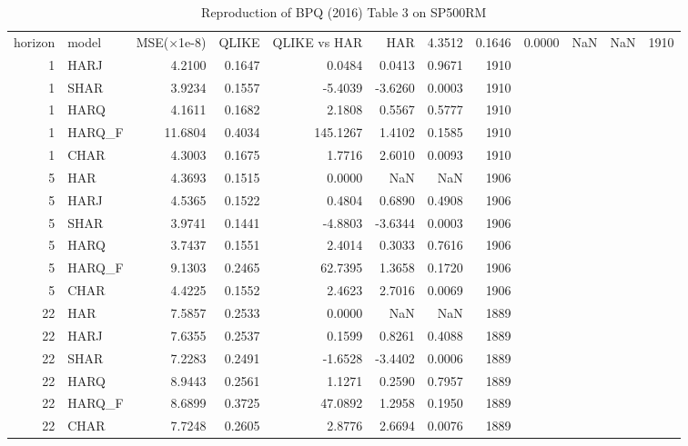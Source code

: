 \begin{table}
\caption{Reproduction of BPQ (2016) Table 3 on SP500RM}
\label{tab:table1_reproduction}
\begin{tabular}{rlrrrrrr}
\toprule
horizon & model & MSE(×1e-8) & QLIKE & QLIKE vs HAR %
 & HAR & 4.3512 & 0.1646 & 0.0000 & NaN & NaN & 1910 \\
1 & HARJ & 4.2100 & 0.1647 & 0.0484 & 0.0413 & 0.9671 & 1910 \\
1 & SHAR & 3.9234 & 0.1557 & -5.4039 & -3.6260 & 0.0003 & 1910 \\
1 & HARQ & 4.1611 & 0.1682 & 2.1808 & 0.5567 & 0.5777 & 1910 \\
1 & HARQ_F & 11.6804 & 0.4034 & 145.1267 & 1.4102 & 0.1585 & 1910 \\
1 & CHAR & 4.3003 & 0.1675 & 1.7716 & 2.6010 & 0.0093 & 1910 \\
5 & HAR & 4.3693 & 0.1515 & 0.0000 & NaN & NaN & 1906 \\
5 & HARJ & 4.5365 & 0.1522 & 0.4804 & 0.6890 & 0.4908 & 1906 \\
5 & SHAR & 3.9741 & 0.1441 & -4.8803 & -3.6344 & 0.0003 & 1906 \\
5 & HARQ & 3.7437 & 0.1551 & 2.4014 & 0.3033 & 0.7616 & 1906 \\
5 & HARQ_F & 9.1303 & 0.2465 & 62.7395 & 1.3658 & 0.1720 & 1906 \\
5 & CHAR & 4.4225 & 0.1552 & 2.4623 & 2.7016 & 0.0069 & 1906 \\
22 & HAR & 7.5857 & 0.2533 & 0.0000 & NaN & NaN & 1889 \\
22 & HARJ & 7.6355 & 0.2537 & 0.1599 & 0.8261 & 0.4088 & 1889 \\
22 & SHAR & 7.2283 & 0.2491 & -1.6528 & -3.4402 & 0.0006 & 1889 \\
22 & HARQ & 8.9443 & 0.2561 & 1.1271 & 0.2590 & 0.7957 & 1889 \\
22 & HARQ_F & 8.6899 & 0.3725 & 47.0892 & 1.2958 & 0.1950 & 1889 \\
22 & CHAR & 7.7248 & 0.2605 & 2.8776 & 2.6694 & 0.0076 & 1889 \\
\bottomrule
\end{tabular}
\end{table}
